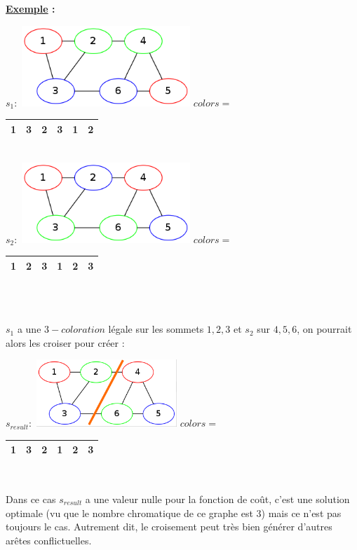 \documentclass{article}
\begin{document}
\begin{sffamily}
\begin{enumerate}
\begin{enumerate}
\textbf{\underline{Exemple} :} 

\begin{center}
	$s_1 : $
    \includegraphics[width=240px]{ex3.png}
    $colors = $
	\begin{tabular}{|c|c|c|c|c|c|}
	\hline
	1 & 3 & 2 & 3 & 1 & 2\\
	\hline
	\end{tabular}\\
	$s_2 :$
	\includegraphics[width=240px]{ex3_2.png}
    $colors = $
	\begin{tabular}{|c|c|c|c|c|c|}
	\hline
	1 & 2 & 3 & 1 & 2 & 3\\
	\hline
	\end{tabular}  \\$ $\\
\end{center}

$s_1$ a une $3-coloration$ légale sur les sommets ${1,2,3}$ et $s_2$ sur ${4,5,6}$, on pourrait alors les croiser pour créer :
\begin{center}
	$s_{result}: $
    \includegraphics[width=200px]{ex3_3.png}
    $colors = $
	\begin{tabular}{|c|c|c|c|c|c|}
	\hline
	1 & 3 & 2 & 1 & 2 & 3\\
	\hline
	\end{tabular}\\
\end{center}

Dans ce cas $s_{result}$ a une valeur nulle pour la fonction de coût, c'est une solution optimale (vu que le nombre chromatique 
de ce graphe est $3$) mais ce n'est pas toujours le cas. Autrement dit, le croisement peut très bien générer d'autres arêtes 
conflictuelles.


\end{enumerate}
\end{enumerate}
\end{sffamily}
\end{document}
